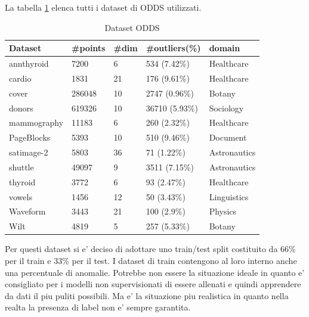 La tabella \ref{odds} elenca tutti i dataset di ODDS utilizzati.

\begin{table}

    \centering
\begin{tabular}{|l|l|l|l|l|}
	\hline
	\textbf{Dataset} & \textbf{\#points} & \textbf{\#dim} & \textbf{\#outliers(\%)} & \textbf{domain} \\ \hline
	annthyroid       & 7200              & 6              & 534 (7.42\%)            & Healthcare      \\ \hline
	cardio           & 1831              & 21             & 176 (9.61\%)            & Healthcare      \\ \hline
	cover            & 286048            & 10             & 2747 (0.96\%)           & Botany          \\ \hline
	donors           & 619326            & 10             & 36710 (5.93\%)          & Sociology       \\ \hline
	mammography      & 11183             & 6              & 260 (2.32\%)            & Healthcare      \\ \hline
	PageBlocks       & 5393              & 10             & 510 (9.46\%)            & Document        \\ \hline
	satimage-2       & 5803              & 36             & 71 (1.22\%)             & Astronautics    \\ \hline
	shuttle          & 49097             & 9              & 3511 (7.15\%)           & Astronautics    \\ \hline
	thyroid          & 3772              & 6              & 93 (2.47\%)             & Healthcare      \\ \hline
	vowels           & 1456              & 12             & 50 (3.43\%)             & Linguistics     \\ \hline
	Waveform         & 3443              & 21             & 100 (2.9\%)             & Physics         \\ \hline
	Wilt             & 4819              & 5              & 257 (5.33\%)            & Botany          \\ \hline
\end{tabular}
\caption{\label{odds}Dataset ODDS}
\end{table}

Per questi dataset si e' deciso di adottare uno train/test split costituito da 66\% per il train e 33\% per il test. I dataset di train contengono al loro interno anche una percentuale di anomalie. Potrebbe non essere la situazione ideale in quanto e' consigliato per i modelli non supervisionati di essere allenati e quindi apprendere da dati il piu puliti possibili. Ma e' la situazione piu realistica in quanto nella realta la presenza di label non e' sempre garantita.  


